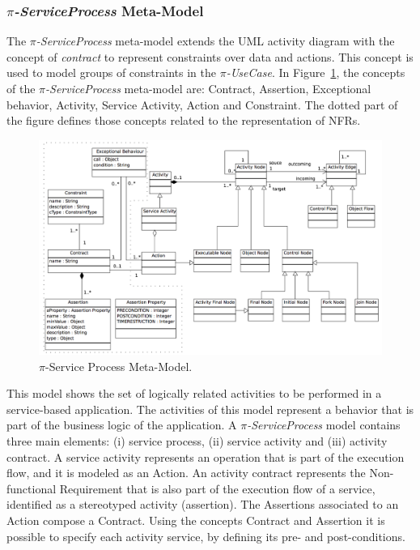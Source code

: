 \documentclass{singlecol-new}
\theoremstyle{TH}{
\newtheorem{lemma}{Lemma}
\newtheorem{theorem}[lemma]{Theorem}
\newtheorem{corrolary}[lemma]{Corrolary}
\newtheorem{conjecture}[lemma]{Conjecture}
\newtheorem{proposition}[lemma]{Proposition}
\newtheorem{claim}[lemma]{Claim}
\newtheorem{stheorem}[lemma]{Wrong Theorem}
\newtheorem{algorithm}{Algorithm}
}
\theoremstyle{THrm}{
\newtheorem{definition}{Definition}[section]
\newtheorem{question}{Question}[section]
\newtheorem{remark}{Remark}
\newtheorem{scheme}{Scheme}
}
\theoremstyle{THhit}{
\newtheorem{case}{Case}[section]
}
\theoremstyle{THhsl}{
\newtheorem{example}{Example}
}
\begin{document}
\subsubsection{\textit{$\pi$-ServiceProcess} Meta-Model}%

The \textit{$\pi$-ServiceProcess} meta-model extends the UML activity diagram with the concept of \textit{contract} to represent constraints over data and actions. This concept is used to model
groups  of  constraints  in the \textit{$\pi$-UseCase}.
In Figure~\ref{fig:CIM:serviceprocessmetamodel}, the concepts of the \textit{$\pi$-Ser\-vice\-Process} meta-model are: {\sc Contract}, {\sc Assertion}, {\sc Exceptional behavior}, {\sc Activity}, {\sc Ser\-vice Acti\-vi\-ty}, {\sc Action} and {\sc Constraint}.
The dotted part of the figure defines those concepts related to the representation of NFRs.

\begin{figure}[h]
\center
\includegraphics[width=1\textwidth]{./figures/ServiceProcessMetaModel.pdf}
\caption{\label{fig:CIM:serviceprocessmetamodel} $\pi$-Service Process Meta-Model.}
\end{figure}

This model shows the set of logically related activities to be performed in a service-based application.
The activities of this model represent a behavior that is part of the business logic of the application.
A \textit{$\pi$-ServiceProcess}  model contains three main elements: (i) service process, (ii) service activity and (iii) activity contract. A service activity represents an operation that is part of the execution flow, and it is modeled as an {\sc Action}.
An activity contract represents the {\sc Non-functional Requirement}  that is also part of the execution flow of a service, identified  as a stereotyped activity ({\sf assertion}).
The {\sc Assertion}s associated to an {\sc Action} compose a {\sc Contract}. 
Using the concepts {\sc Contract} and {\sc Assertion} it is possible to specify each activity service, by defining its pre- and post-conditions.
\end{document}
